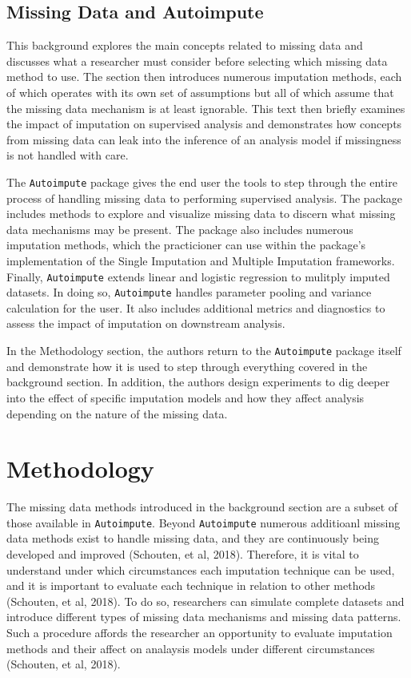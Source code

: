 \documentclass[12pt,oneside]{chicagocapstone}
\begin{document}
\section*{Missing Data and
Autoimpute}\label{background-missing-data-autoimpute}

This background explores the main concepts related to missing data and
discusses what a researcher must consider before selecting which missing
data method to use. The section then introduces numerous imputation
methods, each of which operates with its own set of assumptions but all
of which assume that the missing data mechanism is at least ignorable.
This text then briefly examines the impact of imputation on supervised
analysis and demonstrates how concepts from missing data can leak into
the inference of an analysis model if missingness is not handled with
care.

The \texttt{Autoimpute} package gives the end user the tools to step
through the entire process of handling missing data to performing
supervised analysis. The package includes methods to explore and
visualize missing data to discern what missing data mechanisms may be
present. The package also includes numerous imputation methods, which
the practicioner can use within the package's implementation of the
Single Imputation and Multiple Imputation frameworks. Finally,
\texttt{Autoimpute} extends linear and logistic regression to mulitply
imputed datasets. In doing so, \texttt{Autoimpute} handles parameter
pooling and variance calculation for the user. It also includes
additional metrics and diagnostics to assess the impact of imputation on
downstream analysis.

In the Methodology section, the authors return to the
\texttt{Autoimpute} package itself and demonstrate how it is used to
step through everything covered in the background section. In addition,
the authors design experiments to dig deeper into the effect of specific
imputation models and how they affect analysis depending on the nature
of the missing data.

\hypertarget{methodology}{\chapter*{Methodology}\label{methodology}}

The missing data methods introduced in the background section are a
subset of those available in \texttt{Autoimpute}. Beyond
\texttt{Autoimpute} numerous additioanl missing data methods exist to
handle missing data, and they are continuously being developed and
improved (Schouten, et al, 2018). Therefore, it is vital to understand
under which circumstances each imputation technique can be used, and it
is important to evaluate each technique in relation to other methods
(Schouten, et al, 2018). To do so, researchers can simulate complete
datasets and introduce different types of missing data mechanisms and
missing data patterns. Such a procedure affords the researcher an
opportunity to evaluate imputation methods and their affect on analaysis
models under different circumstances (Schouten, et al, 2018).
\end{document}
